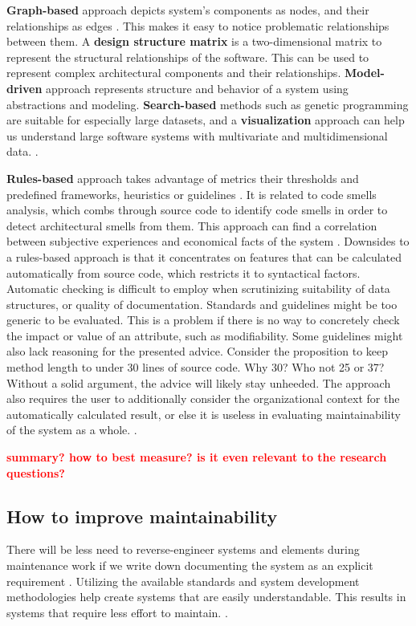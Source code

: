 \documentclass[utf8,english]{gradu3}
\newcommand{\todo}[1]{\textbf{\textcolor{red}{#1}}}
\begin{document}
\textbf{Graph-based} approach depicts system's components as nodes, and their
relationships as edges \parencite{Mumtaz2021}. This makes it easy to notice
problematic relationships between them. A \textbf{design structure matrix} is a
two-dimensional matrix to represent the structural relationships of the
software. This can be used to represent complex architectural components and
their relationships. \textbf{Model-driven} approach represents structure and
behavior of a system using abstractions and modeling. \textbf{Search-based}
methods such as genetic programming are suitable for especially large datasets,
and a \textbf{visualization} approach can help us understand large software
systems with multivariate and multidimensional data.
\parencite[9-14]{Mumtaz2021}.

\textbf{Rules-based} approach takes advantage of metrics their thresholds and
predefined frameworks, heuristics or guidelines \parencite[8]{Mumtaz2021}. It is
related to code smells analysis, which combs through source code to identify
code smells in order to detect architectural smells from them. This approach can
find a correlation between subjective experiences and economical facts of the
system \parencite[22]{Broy2006}. Downsides to a rules-based approach is that it
concentrates on features that can be calculated automatically from source code,
which restricts it to syntactical factors. Automatic checking is difficult to
employ when scrutinizing suitability of data structures, or quality of
documentation. Standards and guidelines might be too generic to be evaluated.
This is a problem if there is no way to concretely check the impact or value of
an attribute, such as modifiability. Some guidelines might also lack reasoning
for the presented advice. Consider the proposition to keep method length to
under 30 lines of source code. Why 30? Who not 25 or 37? Without a solid
argument, the advice will likely stay unheeded. The approach also requires the
user to additionally consider the organizational context for the automatically
calculated result, or else it is useless in evaluating maintainability of the
system as a whole. \parencite[22]{Broy2006}.

\todo{summary? how to best measure? is it even relevant to the research questions?}

\subsection{How to improve maintainability}

There will be less need to reverse-engineer systems and elements during
maintenance work if we write down documenting the system as an explicit
requirement \parencite[96]{IEEE12207}. Utilizing the available standards and
system development methodologies help create systems that are easily
understandable.  This results in systems that require less effort to maintain.
\parencite[608]{Gorla2010}.
\end{document}
